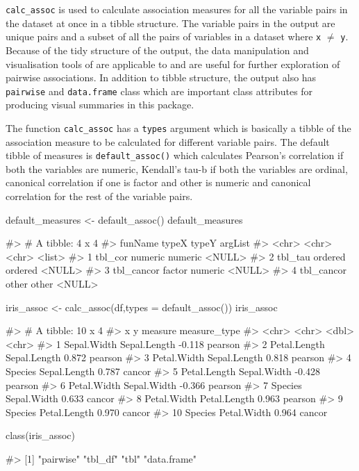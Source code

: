 \texttt{calc\_assoc} is used to calculate association measures for all
the variable pairs in the dataset at once in a tibble structure. The
variable pairs in the output are unique pairs and a subset of all the
pairs of variables in a dataset where \texttt{x} \(\neq\) \texttt{y}.
Because of the tidy structure of the output, the data manipulation and
visualisation tools of  \citep{tidyverse} are
applicable to and are useful for further exploration of pairwise
associations. In addition to tibble structure, the output also has
\texttt{pairwise} and \texttt{data.frame} class which are important
class attributes for producing visual summaries in this package.

The function \texttt{calc\_assoc} has a \texttt{types} argument which is
basically a tibble of the association measure to be calculated for
different variable pairs. The default tibble of measures is
\texttt{default\_assoc()} which calculates Pearson's correlation if both
the variables are numeric, Kendall's tau-b if both the variables are
ordinal, canonical correlation if one is factor and other is numeric and
canonical correlation for the rest of the variable pairs.

\begin{Schunk}
\begin{Sinput}
default_measures <- default_assoc()
default_measures
\end{Sinput}
\begin{Soutput}
#> # A tibble: 4 x 4
#>   funName    typeX   typeY   argList
#>   <chr>      <chr>   <chr>   <list> 
#> 1 tbl_cor    numeric numeric <NULL> 
#> 2 tbl_tau    ordered ordered <NULL> 
#> 3 tbl_cancor factor  numeric <NULL> 
#> 4 tbl_cancor other   other   <NULL>
\end{Soutput}
\begin{Sinput}
iris_assoc <- calc_assoc(df,types = default_assoc())
iris_assoc
\end{Sinput}
\begin{Soutput}
#> # A tibble: 10 x 4
#>    x            y            measure measure_type
#>    <chr>        <chr>          <dbl> <chr>       
#>  1 Sepal.Width  Sepal.Length  -0.118 pearson     
#>  2 Petal.Length Sepal.Length   0.872 pearson     
#>  3 Petal.Width  Sepal.Length   0.818 pearson     
#>  4 Species      Sepal.Length   0.787 cancor      
#>  5 Petal.Length Sepal.Width   -0.428 pearson     
#>  6 Petal.Width  Sepal.Width   -0.366 pearson     
#>  7 Species      Sepal.Width    0.633 cancor      
#>  8 Petal.Width  Petal.Length   0.963 pearson     
#>  9 Species      Petal.Length   0.970 cancor      
#> 10 Species      Petal.Width    0.964 cancor
\end{Soutput}
\begin{Sinput}
class(iris_assoc)
\end{Sinput}
\begin{Soutput}
#> [1] "pairwise"   "tbl_df"     "tbl"        "data.frame"
\end{Soutput}
\end{Schunk}

